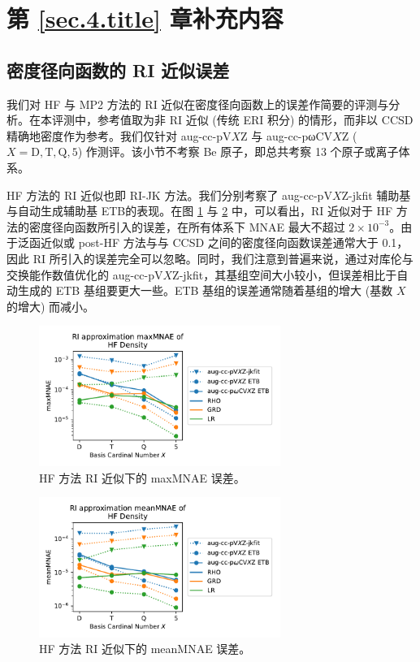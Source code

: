
\section{第 \ref{sec.4.title} 章补充内容}

\subsection{密度径向函数的 RI 近似误差}

我们对 HF 与 MP2 方法的 RI 近似在密度径向函数上的误差作简要的评测与分析。在本评测中，参考值取为非 RI 近似 (传统 ERI 积分) 的情形，而非以 CCSD 精确地密度作为参考。我们仅针对 aug-cc-pV$X$Z 与 aug-cc-pωCV$X$Z ($X=\mathrm{D,T,Q,5}$) 作测评。该小节不考察 Be 原子，即总共考察 13 个原子或离子体系。

HF 方法的 RI 近似也即 RI-JK 方法。我们分别考察了 aug-cc-pV$X$Z-jkfit 辅助基与自动生成辅助基 ETB的表现。在图 \ref{fig.4.HF-RI-err} 与 \ref{fig.4.HF-RI-mean} 中，可以看出，RI 近似对于 HF 方法的密度径向函数所引入的误差，在所有体系下 MNAE 最大不超过 $2 \times 10^{-3}$。由于泛函近似或 post-HF 方法与与 CCSD 之间的密度径向函数误差通常大于 0.1，因此 RI 所引入的误差完全可以忽略。同时，我们注意到普遍来说，通过对库伦与交换能作数值优化的 aug-cc-pV$X$Z-jkfit，其基组空间大小较小，但误差相比于自动生成的 ETB 基组要更大一些。ETB 基组的误差通常随着基组的增大 (基数 $X$ 的增大) 而减小。

\begin{figure}[t]
  \centering
  \includegraphics[width=0.7\textwidth]{assets/HF-RI-err.pdf}
  \caption[HF 方法 RI 近似下的 maxMNAE 误差]{HF 方法 RI 近似下的 maxMNAE 误差。}
  \label{fig.4.HF-RI-err}
\end{figure}

\begin{figure}[t]
  \centering
  \includegraphics[width=0.7\textwidth]{assets/HF-RI-mean.pdf}
  \caption[HF 方法 RI 近似下的 meanMNAE 误差]{HF 方法 RI 近似下的 meanMNAE 误差。}
  \label{fig.4.HF-RI-mean}
\end{figure}

